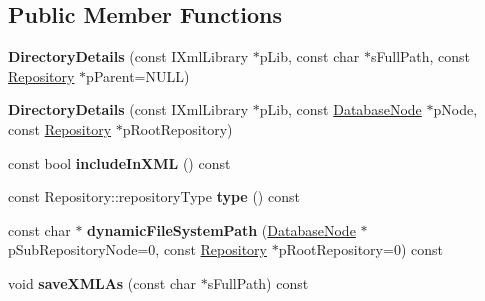 \subsection*{\-Public \-Member \-Functions}
\begin{DoxyCompactItemize}
\item 
\hypertarget{classgeneral__server_1_1DirectoryDetails_a767761c3a22de91b5b6db1a9ee37a707}{{\bfseries \-Directory\-Details} (const \-I\-Xml\-Library $\ast$p\-Lib, const char $\ast$s\-Full\-Path, const \hyperlink{classgeneral__server_1_1Repository}{\-Repository} $\ast$p\-Parent=\-N\-U\-L\-L)}\label{classgeneral__server_1_1DirectoryDetails_a767761c3a22de91b5b6db1a9ee37a707}

\item 
\hypertarget{classgeneral__server_1_1DirectoryDetails_ae7203cfd80eed37dc6d9ed6a09cf4452}{{\bfseries \-Directory\-Details} (const \-I\-Xml\-Library $\ast$p\-Lib, const \hyperlink{classgeneral__server_1_1DatabaseNode}{\-Database\-Node} $\ast$p\-Node, const \hyperlink{classgeneral__server_1_1Repository}{\-Repository} $\ast$p\-Root\-Repository)}\label{classgeneral__server_1_1DirectoryDetails_ae7203cfd80eed37dc6d9ed6a09cf4452}

\item 
\hypertarget{classgeneral__server_1_1DirectoryDetails_ab2dbb21942db7d0d31b7bc823b727022}{const bool {\bfseries include\-In\-X\-M\-L} () const }\label{classgeneral__server_1_1DirectoryDetails_ab2dbb21942db7d0d31b7bc823b727022}

\item 
\hypertarget{classgeneral__server_1_1DirectoryDetails_ae84fac5eeaef7448b8dd7059f9cfd629}{const \-Repository\-::repository\-Type {\bfseries type} () const }\label{classgeneral__server_1_1DirectoryDetails_ae84fac5eeaef7448b8dd7059f9cfd629}

\item 
\hypertarget{classgeneral__server_1_1DirectoryDetails_a8e616a884aa8ba78bf8b31bf42328c2e}{const char $\ast$ {\bfseries dynamic\-File\-System\-Path} (\hyperlink{classgeneral__server_1_1DatabaseNode}{\-Database\-Node} $\ast$p\-Sub\-Repository\-Node=0, const \hyperlink{classgeneral__server_1_1Repository}{\-Repository} $\ast$p\-Root\-Repository=0) const }\label{classgeneral__server_1_1DirectoryDetails_a8e616a884aa8ba78bf8b31bf42328c2e}

\item 
\hypertarget{classgeneral__server_1_1DirectoryDetails_a5870a799843f52129a957b2161b27d68}{void {\bfseries save\-X\-M\-L\-As} (const char $\ast$s\-Full\-Path) const }\label{classgeneral__server_1_1DirectoryDetails_a5870a799843f52129a957b2161b27d68}


\end{DoxyCompactItemize}
